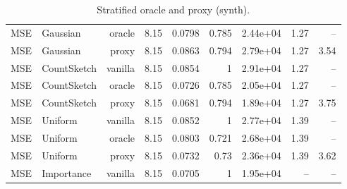 \begin{table}[t]
\begin{tabular}{llrrrrrrr}
MSE & Gaussian & oracle & 8.15 & 0.0798 & 0.785 & 2.44e+04 & 1.27 & -- \\
MSE & Gaussian & proxy & 8.15 & 0.0863 & 0.794 & 2.79e+04 & 1.27 & 3.54 \\
MSE & CountSketch & vanilla & 8.15 & 0.0854 & 1 & 2.91e+04 & 1.27 & -- \\
MSE & CountSketch & oracle & 8.15 & 0.0726 & 0.785 & 2.05e+04 & 1.27 & -- \\
MSE & CountSketch & proxy & 8.15 & 0.0681 & 0.794 & 1.89e+04 & 1.27 & 3.75 \\
MSE & Uniform & vanilla & 8.15 & 0.0852 & 1 & 2.77e+04 & 1.39 & -- \\
MSE & Uniform & oracle & 8.15 & 0.0803 & 0.721 & 2.68e+04 & 1.39 & -- \\
MSE & Uniform & proxy & 8.15 & 0.0732 & 0.73 & 2.36e+04 & 1.39 & 3.62 \\
MSE & Importance & vanilla & 8.15 & 0.0705 & 1 & 1.95e+04 & -- & -- \\
\bottomrule
\end{tabular}
\caption{Stratified oracle and proxy (synth).}
\label{tab:strat_synth}
\end{table}